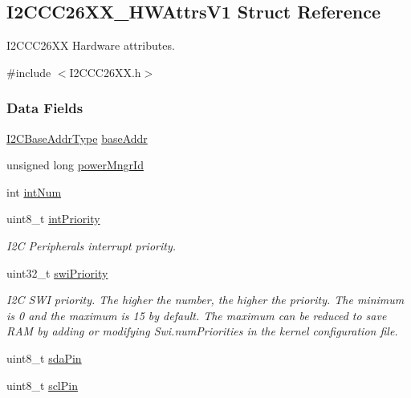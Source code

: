 \subsection{I2\+C\+C\+C26\+X\+X\+\_\+\+H\+W\+Attrs\+V1 Struct Reference}
\label{struct_i2_c_c_c26_x_x___h_w_attrs_v1}


I2\+C\+C\+C26\+X\+X Hardware attributes.  




{\ttfamily \#include $<$I2\+C\+C\+C26\+X\+X.\+h$>$}

\subsubsection*{Data Fields}
\begin{DoxyCompactItemize}
\item 
\hyperlink{_i2_c_c_c26_x_x_8h_a6e087d828c4463de0061d8205b2245d8}{I2\+C\+Base\+Addr\+Type} \hyperlink{struct_i2_c_c_c26_x_x___h_w_attrs_v1_a1dcaf2c98df0688a137d6d36fcf5b813}{base\+Addr}
\item 
unsigned long \hyperlink{struct_i2_c_c_c26_x_x___h_w_attrs_v1_ae4f13a6d9682c89ebaa095ac65550284}{power\+Mngr\+Id}
\item 
int \hyperlink{struct_i2_c_c_c26_x_x___h_w_attrs_v1_a47978d1b0177205345aea6760bdd44ff}{int\+Num}
\item 
uint8\+\_\+t \hyperlink{struct_i2_c_c_c26_x_x___h_w_attrs_v1_af2ce41811fa52e3b70cb2388b1a9a5e4}{int\+Priority}
\begin{DoxyCompactList}\small\item\em I2\+C Peripheral\textquotesingle{}s interrupt priority. \end{DoxyCompactList}\item 
uint32\+\_\+t \hyperlink{struct_i2_c_c_c26_x_x___h_w_attrs_v1_af6dcf5a19b94fa39e89a1435c78f0d61}{swi\+Priority}
\begin{DoxyCompactList}\small\item\em I2\+C S\+W\+I priority. The higher the number, the higher the priority. The minimum is 0 and the maximum is 15 by default. The maximum can be reduced to save R\+A\+M by adding or modifying Swi.\+num\+Priorities in the kernel configuration file. \end{DoxyCompactList}\item 
uint8\+\_\+t \hyperlink{struct_i2_c_c_c26_x_x___h_w_attrs_v1_a3387c3315d2b4f62fedf70563fd55931}{sda\+Pin}
\item 
uint8\+\_\+t \hyperlink{struct_i2_c_c_c26_x_x___h_w_attrs_v1_a0c0d7cba4b01ece784f35192fdc91b0a}{scl\+Pin}
\end{DoxyCompactItemize}


